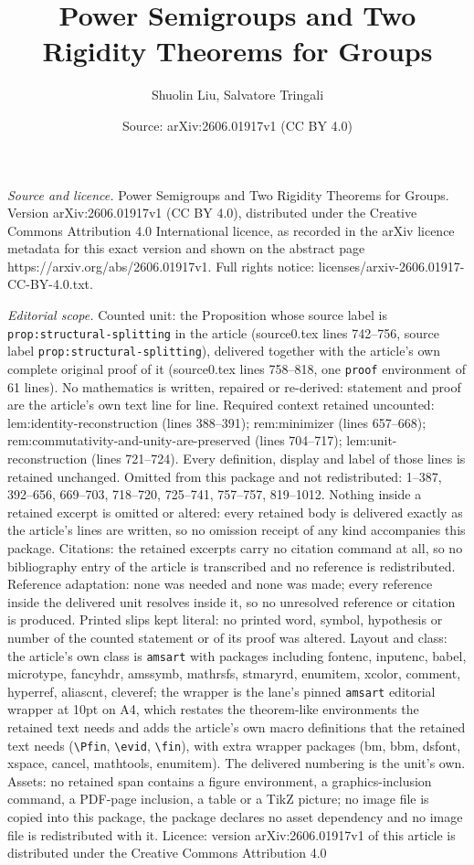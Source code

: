\documentclass[10pt,a4paper]{amsart}
\title[Power Semigroups and Two Rigidity Theorems for Groups]{Power Semigroups and Two Rigidity Theorems for Groups}
\author{Shuolin Liu, Salvatore Tringali}
\date{Source: arXiv:2606.01917v1 (CC BY 4.0)}
\begin{document}
\maketitle

\noindent\emph{Source and licence.} Power Semigroups and Two Rigidity Theorems for Groups. Version arXiv:2606.01917v1 (CC BY 4.0), distributed under the Creative Commons Attribution 4.0 International licence, as recorded in the arXiv licence metadata for this exact version and shown on the abstract page https://arxiv.org/abs/2606.01917v1. Full rights notice: licenses/arxiv-2606.01917-CC-BY-4.0.txt.\par\smallskip

\noindent\textit{Editorial scope.} Counted unit: the Proposition whose source label is \texttt{prop:structural-splitting} in the article (source0.tex lines 742--756, source label \texttt{prop:structural-splitting}), delivered together with the article's own complete original proof of it (source0.tex lines 758--818, one \texttt{proof} environment of 61 lines). No mathematics is written, repaired or re-derived: statement and proof are the article's own text line for line. Required context retained uncounted: lem:identity-reconstruction (lines 388--391); rem:minimizer (lines 657--668); rem:commutativity-and-unity-are-preserved (lines 704--717); lem:unit-reconstruction (lines 721--724). Every definition, display and label of those lines is retained unchanged. Omitted from this package and not redistributed: 1--387, 392--656, 669--703, 718--720, 725--741, 757--757, 819--1012. Nothing inside a retained excerpt is omitted or altered: every retained body is delivered exactly as the article's lines are written, so no omission receipt of any kind accompanies this package. Citations: the retained excerpts carry no citation command at all, so no bibliography entry of the article is transcribed and no reference is redistributed. Reference adaptation: none was needed and none was made; every reference inside the delivered unit resolves inside it, so no unresolved reference or citation is produced. Printed slips kept literal: no printed word, symbol, hypothesis or number of the counted statement or of its proof was altered. Layout and class: the article's own class is \texttt{amsart} with packages including fontenc, inputenc, babel, microtype, fancyhdr, amssymb, mathrsfs, stmaryrd, enumitem, xcolor, comment, hyperref, aliascnt, cleveref; the wrapper is the lane's pinned \texttt{amsart} editorial wrapper at 10pt on A4, which restates the theorem-like environments the retained text needs and adds the article's own macro definitions that the retained text needs (\texttt{\textbackslash Pfin}, \texttt{\textbackslash evid}, \texttt{\textbackslash fin}), with extra wrapper packages (bm, bbm, dsfont, xspace, cancel, mathtools, enumitem). The delivered numbering is the unit's own. Assets: no retained span contains a figure environment, a graphics-inclusion command, a PDF-page inclusion, a table or a TikZ picture; no image file is copied into this package, the package declares no asset dependency and no image file is redistributed with it. Licence: version arXiv:2606.01917v1 of this article is distributed under the Creative Commons Attribution 4.0 
\end{document}
